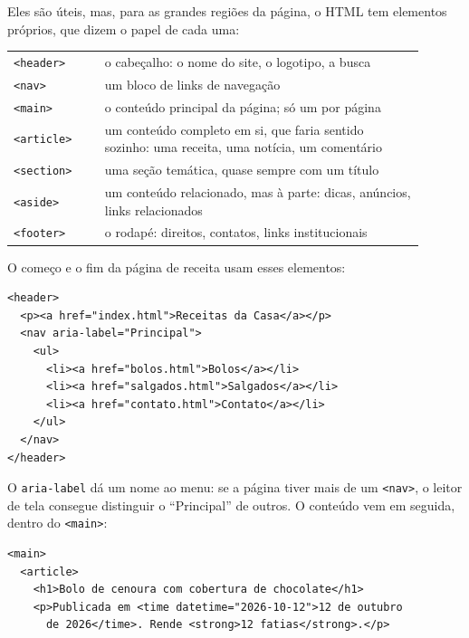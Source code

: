 Eles são úteis, mas, para as grandes regiões da página, o HTML tem elementos próprios, que dizem o papel de cada uma:

\begin{center}
\begin{tabular}{@{}P{0.2\linewidth}P{0.7\linewidth}@{}}
\toprule
{}
 &  \\
\midrule
\texttt{<header>} & o cabeçalho: o nome do site, o logotipo, a busca \\
 \texttt{<nav>} & um bloco de links de navegação \\
\texttt{<main>} & o conteúdo principal da página; só um por página \\
 \texttt{<article>} & um conteúdo completo em si, que faria sentido sozinho: uma receita, uma notícia, um comentário \\
\texttt{<section>} & uma seção temática, quase sempre com um título \\
 \texttt{<aside>} & um conteúdo relacionado, mas à parte: dicas, anúncios, links relacionados \\
\texttt{<footer>} & o rodapé: direitos, contatos, links institucionais \\
\bottomrule
\end{tabular}
\end{center}

O começo e o fim da página de receita usam esses elementos:

\begin{codigo}
\begin{Verbatim}[breaklines=true, breaksymbolleft={}, fontsize=\footnotesize]
<header>
  <p><a href="index.html">Receitas da Casa</a></p>
  <nav aria-label="Principal">
    <ul>
      <li><a href="bolos.html">Bolos</a></li>
      <li><a href="salgados.html">Salgados</a></li>
      <li><a href="contato.html">Contato</a></li>
    </ul>
  </nav>
</header>
\end{Verbatim}
\end{codigo}

O \texttt{aria-label} dá um nome ao menu: se a página tiver mais de um \texttt{<nav>}, o leitor de tela consegue distinguir o ``Principal'' de outros. O conteúdo vem em seguida, dentro do \texttt{<main>}:

\begin{codigo}
\begin{Verbatim}[breaklines=true, breaksymbolleft={}, fontsize=\footnotesize]
<main>
  <article>
    <h1>Bolo de cenoura com cobertura de chocolate</h1>
    <p>Publicada em <time datetime="2026-10-12">12 de outubro
      de 2026</time>. Rende <strong>12 fatias</strong>.</p>
\end{Verbatim}
\end{codigo}

